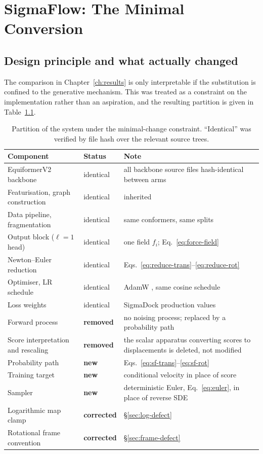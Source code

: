 \chapter{SigmaFlow: The Minimal Conversion}
\label{ch:sigmaflow}

\section{Design principle and what actually changed}
\label{sec:minimal-change}

The comparison in Chapter~\ref{ch:results} is only interpretable if the
substitution is confined to the generative mechanism. This was treated as a
constraint on the implementation rather than an aspiration, and the resulting
partition is given in Table~\ref{tab:minimal-change}.

\begin{table}[htbp]
\centering
\caption{Partition of the system under the minimal-change constraint.
``Identical'' was verified by file hash over the relevant source trees.}
\label{tab:minimal-change}
\small
\begin{tabular}{@{}p{} p{} p{}@{}}
\toprule
\textbf{Component} & \textbf{Status} & \textbf{Note} \\
\midrule
EquiformerV2 backbone      & identical & all backbone source files hash-identical between arms \\
Featurisation, graph construction & identical & inherited \\
Data pipeline, fragmentation & identical & same conformers, same splits \\
Output block ($\ell=1$ head) & identical & one field $f_i$; Eq.~\eqref{eq:force-field} \\
Newton--Euler reduction     & identical & Eqs.~\eqref{eq:reduce-trans}--\eqref{eq:reduce-rot} \\
Optimiser, LR schedule      & identical & AdamW \citep{loshchilov2019adamw}, same cosine schedule \\
Loss weights                & identical & SigmaDock production values \\
\midrule
Forward process             & \textbf{removed} & no noising process; replaced by a probability path \\
Score interpretation and rescaling & \textbf{removed} & the scalar apparatus converting scores to displacements is deleted, not modified \\
Probability path            & \textbf{new} & Eqs.~\eqref{eq:sf-trans}--\eqref{eq:sf-rot} \\
Training target             & \textbf{new} & conditional velocity in place of score \\
Sampler                     & \textbf{new} & deterministic Euler, Eq.~\eqref{eq:euler}, in place of reverse SDE \\
\midrule
Logarithmic map clamp       & \textbf{corrected} & \S\ref{sec:log-defect} \\
Rotational frame convention & \textbf{corrected} & \S\ref{sec:frame-defect} \\
\bottomrule
\end{tabular}
\end{table}

